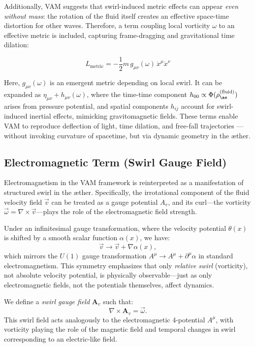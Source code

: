 \documentclass[a4paper,12pt]{article}
\begin{document}
Additionally, VAM suggests that swirl-induced metric effects can appear \emph{even without mass}: the rotation of the fluid itself creates an effective space-time distortion for other waves. Therefore, a term coupling local vorticity \( \omega \) to an effective metric is included, capturing frame-dragging and gravitational time dilation:

\begin{equation}
    L_{\text{metric}} = -\frac{1}{2}m\, g_{\mu\nu}(\omega) \, \dot{x}^\mu \dot{x}^\nu
    \label{eq:metric-vorticity}
\end{equation}

Here, \( g_{\mu\nu}(\omega) \) is an emergent metric depending on local swirl. It can be expanded as \( \eta_{\mu\nu} + h_{\mu\nu}(\omega) \), where the time-time component \( h_{00} \propto \Phi(\rho_{\ae}^{(\text{fluid})}) \) arises from pressure potential, and spatial components \( h_{ij} \) account for swirl-induced inertial effects, mimicking gravitomagnetic fields. These terms enable VAM to reproduce deflection of light, time dilation, and free-fall trajectories — without invoking curvature of spacetime, but via dynamic geometry in the æther.

\subsection{Electromagnetic Term (Swirl Gauge Field)}

Electromagnetism in the VAM framework is reinterpreted as a manifestation of structured swirl in the æther. Specifically, the irrotational component of the fluid velocity field \( \vec{v} \) can be treated as a gauge potential \( A_v \), and its curl—the vorticity \( \vec{\omega} = \nabla \times \vec{v} \)—plays the role of the electromagnetic field strength.

Under an infinitesimal gauge transformation, where the velocity potential \( \theta(x) \) is shifted by a smooth scalar function \( \alpha(x) \), we have:
\[
\vec{v} \to \vec{v} + \nabla \alpha(x),
\]
which mirrors the $U(1)$ gauge transformation \( A^\mu \to A^\mu + \partial^\mu \alpha \) in standard electromagnetism. This symmetry emphasizes that only \textit{relative swirl} (vorticity), not absolute velocity potential, is physically observable—just as only electromagnetic fields, not the potentials themselves, affect dynamics.

\vspace{1em}
We define a \emph{swirl gauge field} \( \mathbf{A}_v \) such that:
\[
\nabla \times \mathbf{A}_v = \vec{\omega}.
\]
This swirl field acts analogously to the electromagnetic 4-potential \( A^\mu \), with vorticity playing the role of the magnetic field and temporal changes in swirl corresponding to an electric-like field.
\end{document}
